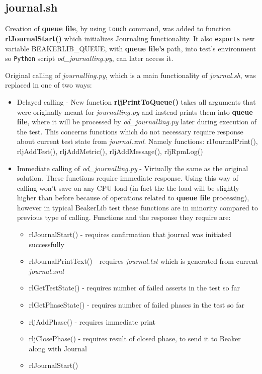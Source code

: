 \subsection{journal.sh}
Creation of  \textbf{queue file}, by using \texttt{touch} command, was added to function \textbf{rlJournalStart()} which initializes Journaling functionality. It also \texttt{exports} new variable BEAKERLIB\_QUEUE, with \textbf{queue file's} path, into test's environment so \texttt{Python} script \textit{od\_journalling.py}, can later access it.

Original calling of \textit{journalling.py}, which is a main functionality of \textit{journal.sh}, was replaced in one of two ways:

\begin{itemize}
\item Delayed calling - New function \textbf{rljPrintToQueue()} takes all arguments that were originally meant for \textit{journalling.py} and instead prints them into \textbf{queue file}, where it will be processed by \textit{od\_journalling.py} later during execution of the test. This concerns functions which do not necessary require response about current test state from \textit{journal.xml}.  Namely functions: rlJournalPrint(), rljAddTest(), rljAddMetric(), rljAddMessage(), rljRpmLog()
\item Immediate calling of \textit{od\_journalling.py} - Virtually the same as the original solution. These functions require immediate response. Using this way of calling won't save on any CPU load (in fact the the load will be slightly higher than before because of operations related to \textbf{queue file} processing), however in typical BeakerLib test these functions are in minority compared to previous type of calling.  Functions and the response they require are:  
\begin{itemize}
\item rlJournalStart() - requires confirmation that journal was initiated successfully
\item rlJournalPrintText() - requires \textit{journal.txt} which is generated from current \mbox{\textit{journal.xml}}
\item rlGetTestState()  - requires number of failed asserts in the test so far
\item rlGetPhaseState() - requires number of failed phases in the test so far
\item rljAddPhase() - requires immediate print
\item rljClosePhase() - requires result of closed phase, to send it to Beaker along with Journal
\item rlJournalStart()
\end{itemize}
\end{itemize}

